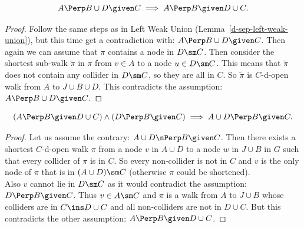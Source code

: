 \begin{Lem} 
    \[A \Perp  B \cup  D \given C \implies A \Perp  B \given D \cup  C.\]
\begin{proof}
    Follow the same steps as in Left Weak Union (Lemma~\ref{d-sep-left-weak-union}), 
    but this time get a contradiction with:
    $A \Perp  B \cup  D \given C$.
    Then again we can assume that $\pi$ contains a node in $D \sm C$. 
    Then consider the shortest sub-walk $\tilde \pi$ in $\pi$ from $v \in A$ to a node $u \in D \sm C$.
    This means that $\tilde \pi$ does not contain any collider in $D\sm C$, 
    so they are all in $C$. So $\tilde \pi$ is $C$-d-open walk from $A$ to $J \cup B \cup D$. 
    This contradicts the assumption: $A \Perp  B \cup D  \given C$.
\end{proof}
\end{Lem}

\begin{Lem} 
        \label{d-sep-left-contraction}
    \[ (A \Perp  B \given D \cup  C) \land (D \Perp  B \given C) \implies A \cup  D \Perp  B \given C.\]
\begin{proof}
    Let us assume the contrary:  $A \cup D \nPerp  B \given C$.
    Then there exists a shortest $C$-d-open walk $\pi$ 
    from a node $v$ in $A \cup D$ to a node $w$ in $J \cup B$ in $G$ such that every collider of $\pi$ is in $C$. 
    So every non-collider is not in $C$ and $v$ is 
    the only node of $\pi$ that is in $(A \cup D) \sm C$ (otherwise $\pi$ could be shortened). \\
    Also $v$ cannot lie in $D\sm C$ as it would contradict the assumption: $D \Perp  B \given C$.
    Thus $v \in A \sm C$ and $\pi$ is a walk from $A$ to $J \cup B$ whose colliders are in $C \ins D \cup C$ 
    and all non-colliders are not in $D \cup C$.
    But this contradicts the other assumption: $A \Perp  B \given D \cup  C$.
\end{proof}
\end{Lem}

